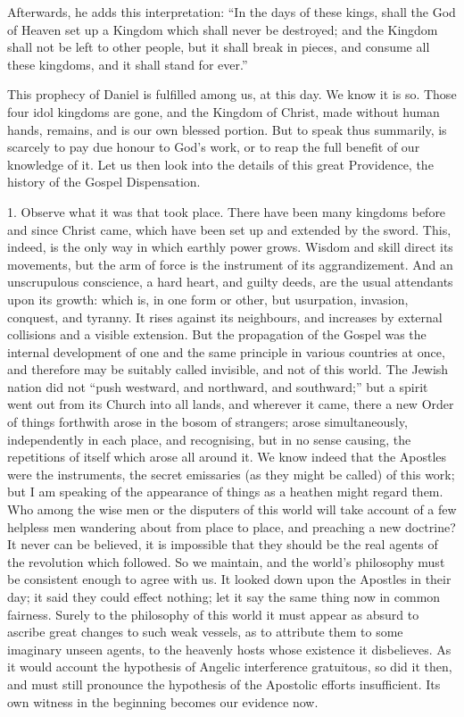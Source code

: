 Afterwards, he adds this interpretation: ``In the days of these
kings, shall the God of Heaven set up a Kingdom which shall never be
destroyed; and the Kingdom shall not be left to other people, but it
shall break in pieces, and consume all these kingdoms, and it shall
stand for ever.''

This prophecy of Daniel is fulfilled among us, at this day. We know
it is so. Those four idol kingdoms are gone, and the Kingdom of Christ,
made without human hands, remains, and is our own blessed portion. But
to speak thus summarily, is scarcely to pay due honour to God's work, or
to reap the full benefit of our knowledge of it. Let us then look into
the details of this great Providence, the history of the Gospel
Dispensation.

1. Observe what it was that took place. There have been many kingdoms
before and since Christ came, which have been set up and extended by the
sword. This, indeed, is the only way in which earthly power grows.
Wisdom and skill direct its movements, but the arm of force is the
instrument of its aggrandizement. And an unscrupulous conscience, a hard
heart, and guilty deeds, are the usual attendants upon its growth: which
is, in one form or other, but usurpation, invasion, conquest, and
tyranny. It rises against its neighbours, and increases by external
collisions and a visible extension. But the propagation of the Gospel
was the internal development of one and the same principle in various
countries at once, and therefore may be suitably called invisible, and
not of this world. The Jewish nation did not ``push westward, and
northward, and southward;'' but a spirit went out from its Church
into all lands, and wherever it came, there a new Order of things
forthwith arose in the bosom of strangers; arose simultaneously,
independently in each place, and recognising, but in no sense causing,
the repetitions of itself which arose all around it. We know indeed that
the Apostles were the instruments, the secret emissaries (as they might
be called) of this work; but I am speaking of the appearance of things
as a heathen might regard them. Who among the wise men or the disputers
of this world will take account of a few helpless men wandering about
from place to place, and preaching a new doctrine? It never can be
believed, it is impossible that they should be the real agents of the
revolution which followed. So we maintain, and the world's philosophy
must be consistent enough to agree with us. It looked down upon the
Apostles in their day; it said they could effect nothing; let it say the
same thing now in common fairness. Surely to the philosophy of this
world it must appear as absurd to ascribe great changes to such weak
vessels, as to attribute them to some imaginary unseen agents, to the
heavenly hosts whose existence it disbelieves. As it would account the
hypothesis of Angelic interference gratuitous, so did it then, and must
still pronounce the hypothesis of the Apostolic efforts insufficient.
Its own witness in the beginning becomes our evidence now.

